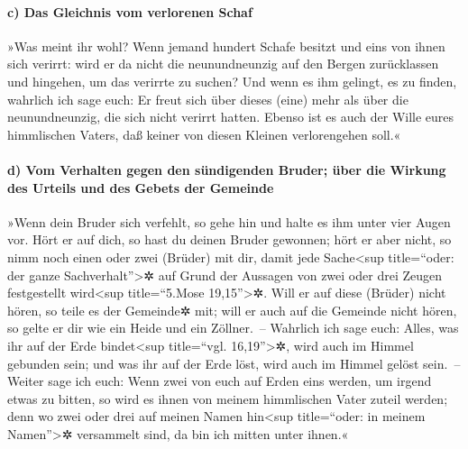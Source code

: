 \hypertarget{c-das-gleichnis-vom-verlorenen-schaf}{%
\paragraph{c) Das Gleichnis vom verlorenen
Schaf}\label{c-das-gleichnis-vom-verlorenen-schaf}}

 »Was meint ihr wohl? Wenn jemand hundert Schafe besitzt
und eins von ihnen sich verirrt: wird er da nicht die neunundneunzig auf
den Bergen zurücklassen und hingehen, um das verirrte zu suchen?
 Und wenn es ihm gelingt, es zu finden, wahrlich ich sage
euch: Er freut sich über dieses (eine) mehr als über die neunundneunzig,
die sich nicht verirrt hatten.  Ebenso ist es auch der
Wille eures himmlischen Vaters, daß keiner von diesen Kleinen
verlorengehen soll.«

\hypertarget{d-vom-verhalten-gegen-den-suxfcndigenden-bruder-uxfcber-die-wirkung-des-urteils-und-des-gebets-der-gemeinde}{%
\paragraph{d) Vom Verhalten gegen den sündigenden Bruder; über die
Wirkung des Urteils und des Gebets der
Gemeinde}\label{d-vom-verhalten-gegen-den-suxfcndigenden-bruder-uxfcber-die-wirkung-des-urteils-und-des-gebets-der-gemeinde}}

 »Wenn dein Bruder sich verfehlt, so gehe hin und halte
es ihm unter vier Augen vor. Hört er auf dich, so hast du deinen Bruder
gewonnen;  hört er aber nicht, so nimm noch einen oder
zwei (Brüder) mit dir, damit jede Sache\textless sup title=``oder: der
ganze Sachverhalt''\textgreater✲ auf Grund der Aussagen von zwei oder
drei Zeugen festgestellt wird\textless sup title=``5.Mose
19,15''\textgreater✲.  Will er auf diese (Brüder) nicht
hören, so teile es der Gemeinde✲ mit; will er auch auf die Gemeinde
nicht hören, so gelte er dir wie ein Heide und ein Zöllner.~--
 Wahrlich ich sage euch: Alles, was ihr auf der Erde
bindet\textless sup title=``vgl. 16,19''\textgreater✲, wird auch im
Himmel gebunden sein; und was ihr auf der Erde löst, wird auch im Himmel
gelöst sein.~--  Weiter sage ich euch: Wenn zwei von euch
auf Erden eins werden, um irgend etwas zu bitten, so wird es ihnen von
meinem himmlischen Vater zuteil werden;  denn wo zwei
oder drei auf meinen Namen hin\textless sup title=``oder: in meinem
Namen''\textgreater✲ versammelt sind, da bin ich mitten unter ihnen.«

